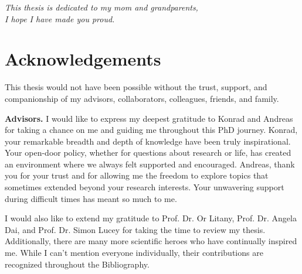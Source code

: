 \newpage
\thispagestyle{empty}
\mbox{}

\newpage
\thispagestyle{empty}
\vspace*{\fill}
\begin{center}
    \textit{
    This thesis is dedicated to my mom and grandparents, \\
    I hope I have made you proud.
    }
\end{center}
\vspace*{\fill}

\newpage
\thispagestyle{empty}
\mbox{}



\chapter{Acknowledgements}
\label{chap:acknowledgements}

This thesis would not have been possible without the trust, support, and companionship of my advisors, collaborators, colleagues, friends, and family.

\noindent
\textbf{Advisors.}
I would like to express my deepest gratitude to Konrad and Andreas for taking a chance on me and guiding me throughout this PhD journey. Konrad, your remarkable breadth and depth of knowledge have been truly inspirational. Your open-door policy, whether for questions about research or life, has created an environment where we always felt supported and encouraged. Andreas, thank you for your trust and for allowing me the freedom to explore topics that sometimes extended beyond your research interests. Your unwavering support during difficult times has meant so much to me.

I would also like to extend my gratitude to Prof. Dr. Or Litany, Prof. Dr. Angela Dai, and Prof. Dr. Simon Lucey for taking the time to review my thesis. Additionally, there are many more scientific heroes who have continually inspired me. While I can't mention everyone individually, their contributions are recognized throughout the Bibliography.

